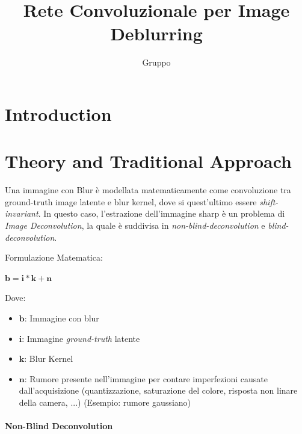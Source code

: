 \documentclass[a4paper,10pt,twocolumn]{article}
\title{\textbf{Rete Convoluzionale per Image Deblurring}}
\author{Gruppo}
\begin{document}

\section{Introduction}\cite{convir}

\section{Theory and Traditional Approach}

Una immagine con Blur \`e modellata matematicamente come convoluzione tra ground-truth image latente e blur kernel, dove si quest'ultimo essere \textit{\gls{shift-invariant}}. In questo caso,
l'estrazione dell'immagine sharp \`e un problema di \textit{Image Deconvolution}, la quale \`e suddivisa in \textit{\Gls{non-blind-deconvolution}} e \textit{\Gls{blind-deconvolution}}.\par
Formulazione Matematica:

\begin{math}
    \bm{b} = \bm{i} * \bm{k} + \bm{n}
\end{math}

Dove:

\begin{itemize}[topsep=0pt, noitemsep]
    \item[] $\bm{b}$: Immagine con blur
    \item[] $\bm{i}$: Immagine \textit{ground-truth} latente
    \item[] $\bm{k}$: Blur Kernel
    \item[] $\bm{n}$: Rumore presente nell'immagine per contare imperfezioni causate dall'acquisizione (quantizzazione, saturazione del colore, risposta non linare della camera, ...) (Esempio: rumore gaussiano)
\end{itemize}

\paragraph*{Non-Blind Deconvolution}
\end{document}
